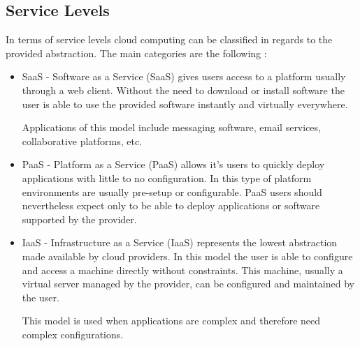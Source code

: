         \subsection{Service Levels}
			In terms of service levels cloud computing can be classified in regards to the provided abstraction. The main categories are the following \cite{Garrison2012,Zhang2010,Mell2011,Sampaio2011,Vaquero2008} :
			\begin{itemize}
				\item{SaaS} - Software as a Service (SaaS) gives users access to a platform usually through a web client. Without the need to  download or install software the user is able to use the provided software instantly and virtually everywhere. 
	    
    			Applications of this model include messaging software, email services, collaborative platforms, etc.  
	    
   				\item{PaaS} - Platform as a Service (PaaS) allows it's users to quickly deploy applications with little to no configuration. In this type of platform environments are usually pre-setup or configurable. PaaS users should nevertheless expect only to be able to deploy applications or software supported by the provider.
	    
	    
    			\item{IaaS} - Infrastructure as a Service (IaaS) represents the lowest abstraction made available by cloud providers. In this model the user is able to configure and access a machine directly without constraints. This machine, usually a virtual server managed by the provider, can be configured and maintained by the user.
	    
    		This model is used when applications are complex and therefore need complex configurations.

			\end{itemize}

